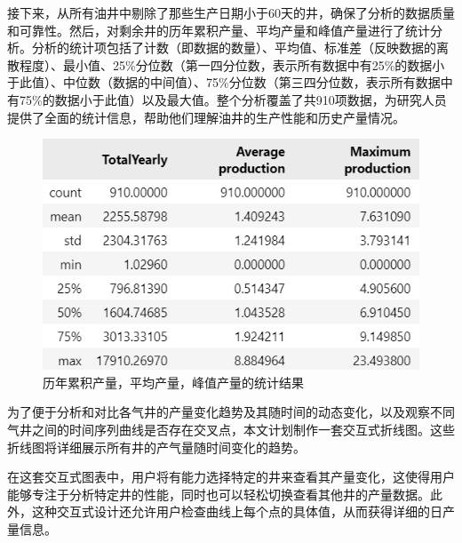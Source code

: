 接下来，从所有油井中剔除了那些生产日期小于60天的井，确保了分析的数据质量和可靠性。然后，对剩余井的历年累积产量、平均产量和峰值产量进行了统计分析。分析的统计项包括了计数（即数据的数量）、平均值、标准差（反映数据的离散程度）、最小值、25\%分位数（第一四分位数，表示所有数据中有25\%的数据小于此值）、中位数（数据的中间值）、75\%分位数（第三四分位数，表示所有数据中有75\%的数据小于此值）以及最大值。整个分析覆盖了共910项数据，为研究人员提供了全面的统计信息，帮助他们理解油井的生产性能和历史产量情况。
\begin{figure}[H]
    \centering
    \includegraphics{figure/gasproduction.png}
    \caption{历年累积产量，平均产量，峰值产量的统计结果}
\end{figure}

为了便于分析和对比各气井的产量变化趋势及其随时间的动态变化，以及观察不同气井之间的时间序列曲线是否存在交叉点，本文计划制作一套交互式折线图。这些折线图将详细展示所有井的产气量随时间变化的趋势。

在这套交互式图表中，用户将有能力选择特定的井来查看其产量变化，这使得用户能够专注于分析特定井的性能，同时也可以轻松切换查看其他井的产量数据。此外，这种交互式设计还允许用户检查曲线上每个点的具体值，从而获得详细的日产量信息。

